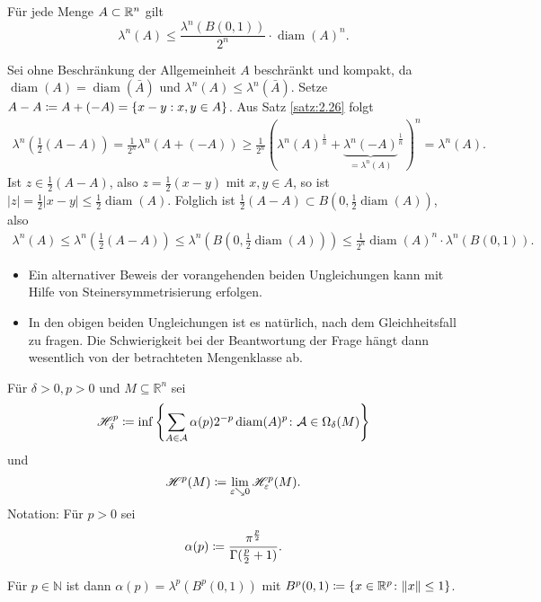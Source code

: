 \documentclass[a4paper,twoside,DIV15,BCOR12mm]{scrbook}
\newcommand{\HM}{\mathscr H}
\DeclareMathOperator{\diam}{diam}
\newcommand{\downto}{\mathrel\searrow}
\begin{document}
\begin{satz}
\label{satz:2.27}
Für jede Menge $A\subset \mathbb{R}^n$ gilt
\[
\lambda^n(A)  \le \frac{\lambda^n(B(0,1))}{2^n} \cdot \diam(A)^n.
\]
\end{satz}

\begin{beweis}
Sei ohne Beschränkung der Allgemeinheit $A$ beschränkt und kompakt, da $\diam(A) = \diam(\bar A)$ und $\lambda^n(A) \le \lambda^n(\bar A)$. Setze $A-A \da A + (-A) = \{ x-y : x,y\in A\}$. Aus Satz \ref{satz:2.26} folgt
\begin{align*}
\lambda^n(\frac12(A-A)) = \frac1{2^n} \lambda^n(A + (-A)) \ge \frac 1{2^n} \left(\lambda^n(A)^{\frac1n} + {\underbrace{\lambda^n(-A)}_{=\lambda^n(A)}}^{\frac1n}\right)^n = \lambda^n(A).
\end{align*}
Ist $z\in\frac12(A-A)$, also $z=\frac12(x-y)$ mit $x,y\in A$, so ist $|z| = \frac 12 |x-y| \le \frac12 \diam(A)$. Folglich ist $\frac12(A-A) \subset B(0,\frac12\diam(A))$, also
\begin{align*}
\lambda^n(A) \le \lambda^n(\frac12(A-A)) \le \lambda^n(B(0,\frac12\diam(A))) \le \frac1{2^n} \diam(A)^n \cdot \lambda^n(B(0,1)).
\end{align*}
\end{beweis}

\begin{bemerkung}
\begin{itemize}
\item Ein alternativer Beweis der vorangehenden beiden Ungleichungen kann mit Hilfe 
von Steinersymmetrisierung erfolgen.
\item In den obigen beiden Ungleichungen ist es natürlich, nach dem Gleichheitsfall 
zu fragen. Die Schwierigkeit bei der Beantwortung der Frage hängt dann wesentlich von 
der betrachteten Mengenklasse ab.
\end{itemize}
\end{bemerkung}

\begin{definition}
Für \(\delta > 0, p>0\) und \(M \subseteq \mathbb R^n\) sei
\[
\HM^p_\delta \da \inf\left\{ \sum_{A\in\mathcal A} \alpha(p) 2^{-p} \diam(A)^p \colon \mathcal A \in \Omega_\delta(M) \right\}
\]
und
\[
\HM^p(M) \da \lim_{\varepsilon\downto0} \HM^p_\varepsilon(M).
\]
Notation: Für \(p>0\) sei
\[
\alpha(p) \da \frac{\pi^{\frac{p}2}}{\Gamma(\frac{p}2+1)} .
\]
\end{definition}

Für $p\in\mathbb{N}$ ist dann  \(\alpha(p) = \lambda^p(B^p(0,1))\) mit \(B^p(0,1) \da \{ x \in \mathbb R^p \colon \|x\| \leq 1 \}\).
\end{document}
